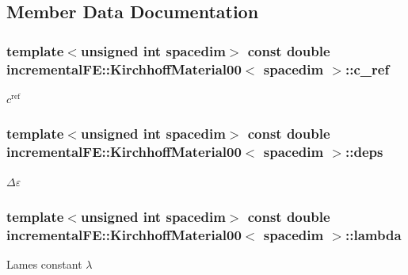 \subsection{Member Data Documentation}
\subsubsection[{\texorpdfstring{c\+\_\+ref}{c_ref}}]{\setlength{\rightskip}{0pt plus 5cm}template$<$unsigned int spacedim$>$ const double {\bf incremental\+F\+E\+::\+Kirchhoff\+Material00}$<$ spacedim $>$\+::c\+\_\+ref\hspace{0.3cm}{\ttfamily [private]}}\hypertarget{classincremental_f_e_1_1_kirchhoff_material00_a4471a11a192ede0c9b16ea8ac9a35c4d}{}\label{classincremental_f_e_1_1_kirchhoff_material00_a4471a11a192ede0c9b16ea8ac9a35c4d}
$c^\mathrm{ref}$ 
\subsubsection[{\texorpdfstring{deps}{deps}}]{\setlength{\rightskip}{0pt plus 5cm}template$<$unsigned int spacedim$>$ const double {\bf incremental\+F\+E\+::\+Kirchhoff\+Material00}$<$ spacedim $>$\+::deps\hspace{0.3cm}{\ttfamily [private]}}\hypertarget{classincremental_f_e_1_1_kirchhoff_material00_ae3992c464bbc9e18a3fc59ffec0b7bc3}{}\label{classincremental_f_e_1_1_kirchhoff_material00_ae3992c464bbc9e18a3fc59ffec0b7bc3}
$\Delta \varepsilon$ 
\subsubsection[{\texorpdfstring{lambda}{lambda}}]{\setlength{\rightskip}{0pt plus 5cm}template$<$unsigned int spacedim$>$ const double {\bf incremental\+F\+E\+::\+Kirchhoff\+Material00}$<$ spacedim $>$\+::lambda\hspace{0.3cm}{\ttfamily [private]}}\hypertarget{classincremental_f_e_1_1_kirchhoff_material00_a7dad9ce289d7ebe9363b82a2fd850067}{}\label{classincremental_f_e_1_1_kirchhoff_material00_a7dad9ce289d7ebe9363b82a2fd850067}
Lame\textquotesingle{}s constant $\lambda$ 
